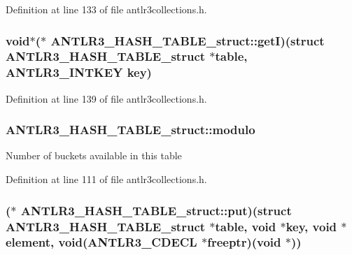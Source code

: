 Definition at line 133 of file antlr3collections.\-h.

\hypertarget{struct_a_n_t_l_r3___h_a_s_h___t_a_b_l_e__struct_a69227961769097578f58029513e3ee7c}{
\subsubsection[{get\-I}]{\setlength{\rightskip}{0pt plus 5cm}void$\ast$($\ast$ A\-N\-T\-L\-R3\-\_\-\-H\-A\-S\-H\-\_\-\-T\-A\-B\-L\-E\-\_\-struct\-::get\-I)(struct {\bf A\-N\-T\-L\-R3\-\_\-\-H\-A\-S\-H\-\_\-\-T\-A\-B\-L\-E\-\_\-struct} $\ast$table, {\bf A\-N\-T\-L\-R3\-\_\-\-I\-N\-T\-K\-E\-Y} key)}}\label{struct_a_n_t_l_r3___h_a_s_h___t_a_b_l_e__struct_a69227961769097578f58029513e3ee7c}


Definition at line 139 of file antlr3collections.\-h.

\hypertarget{struct_a_n_t_l_r3___h_a_s_h___t_a_b_l_e__struct_a3f2e7ebb23797000cbcb15ad5cfbdafe}{
\subsubsection[{modulo}]{ A\-N\-T\-L\-R3\-\_\-\-H\-A\-S\-H\-\_\-\-T\-A\-B\-L\-E\-\_\-struct\-::modulo}}\label{struct_a_n_t_l_r3___h_a_s_h___t_a_b_l_e__struct_a3f2e7ebb23797000cbcb15ad5cfbdafe}
Number of buckets available in this table 

Definition at line 111 of file antlr3collections.\-h.

\hypertarget{struct_a_n_t_l_r3___h_a_s_h___t_a_b_l_e__struct_a4363561883625cf706e55bb15a716b80}{
\subsubsection[{put}]{($\ast$ A\-N\-T\-L\-R3\-\_\-\-H\-A\-S\-H\-\_\-\-T\-A\-B\-L\-E\-\_\-struct\-::put)(struct {\bf A\-N\-T\-L\-R3\-\_\-\-H\-A\-S\-H\-\_\-\-T\-A\-B\-L\-E\-\_\-struct} $\ast$table, void $\ast$key, void $\ast$element, void({\bf A\-N\-T\-L\-R3\-\_\-\-C\-D\-E\-C\-L} $\ast$freeptr)(void $\ast$))}}\label{struct_a_n_t_l_r3___h_a_s_h___t_a_b_l_e__struct_a4363561883625cf706e55bb15a716b80}


